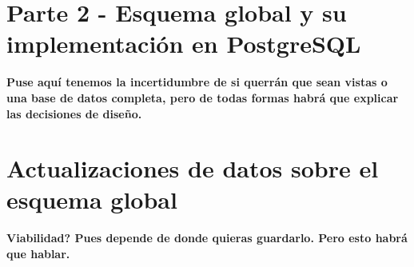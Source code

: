 \documentclass{article}
\begin{document}
\section{Parte 2 - Esquema global y su implementación en PostgreSQL}

\textbf{Puse aquí tenemos la incertidumbre de si querrán que sean vistas o una base de datos completa, pero de todas formas habrá que explicar las decisiones de diseño.}

\section{Actualizaciones de datos sobre el esquema global}

\textbf{Viabilidad? Pues depende de donde quieras guardarlo. Pero esto habrá que hablar.}
\end{document}
